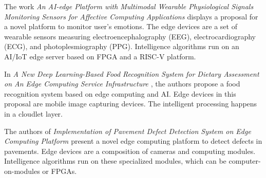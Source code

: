 
The work \textit{An AI-edge Platform with Multimodal Wearable Physiological Signals Monitoring Sensors for Affective Computing Applications \cite{yang2020ai-2}} displays a proposal for a novel platform to monitor user's emotions. The edge devices are a set of wearable sensors measuring electroencephalography (EEG), electrocardiography (ECG), and photoplesmiography (PPG). Intelligence algorithms run on an AI/IoT edge server based on FPGA and a RISC-V platform.



In \textit{A New Deep Learning-Based Food Recognition System for Dietary Assessment on An Edge Computing Service Infrastructure \cite{liu2017new}}, the authors propose a food recognition system based on edge computing and AI. Edge devices in this proposal are mobile image capturing devices. The intelligent processing happens in a cloudlet layer.



The authors of \textit{Implementation of Pavement Defect Detection System on Edge Computing Platform \cite{lin2021implementation}} present a novel edge computing platform to detect defects in pavements. Edge devices are a composition of cameras and computing modules. Intelligence algorithms run on these specialized modules, which can be computer-on-modules or FPGAs.


